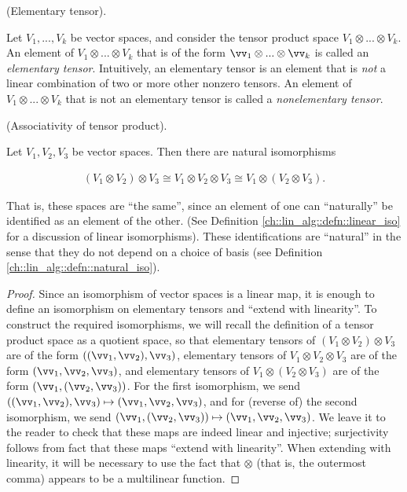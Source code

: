 \begin{defn}
    (Elementary tensor). 
    
    Let $V_1, ..., V_k$ be vector spaces, and consider the tensor product space $V_1 \otimes ... \otimes V_k$. An element of $V_1 \otimes ... \otimes V_k$ that is of the form $\vv_1 \otimes ... \otimes \vv_k$ is called an \textit{elementary tensor}. Intuitively, an elementary tensor is an element that is \textit{not} a linear combination of two or more other nonzero tensors. An element of $V_1 \otimes ... \otimes V_k$ that is not an elementary tensor is called a \textit{nonelementary tensor}.
\end{defn}

\begin{theorem}
    (Associativity of tensor product). 
    
    Let $V_1, V_2, V_3$ be vector spaces. Then there are natural isomorphisms
    
    \begin{align*}
        (V_1 \otimes V_2) \otimes V_3 \cong V_1 \otimes V_2 \otimes V_3 \cong V_1 \otimes (V_2 \otimes V_3).
    \end{align*}
    
    That is, these spaces are ``the same'', since an element of one can ``naturally'' be identified as an element of the other. (See Definition \ref{ch::lin_alg::defn::linear_iso} for a discussion of linear isomorphisms). These identifications are ``natural'' in the sense that they do not depend on a choice of basis (see Definition \ref{ch::lin_alg::defn::natural_iso}).
\end{theorem}

\begin{proof}
    Since an isomorphism of vector spaces is a linear map, it is enough to define an isomorphism on elementary tensors and ``extend with linearity''. To construct the required isomorphisms, we will recall the definition of a tensor product space as a quotient space, so that elementary tensors of $(V_1 \otimes V_2) \otimes V_3$ are of the form $((\vv_1, \vv_2), \vv_3)$, elementary tensors of $V_1 \otimes V_2 \otimes V_3$ are of the form $(\vv_1, \vv_2, \vv_3)$, and elementary tensors of $V_1 \otimes (V_2 \otimes V_3)$ are of the form $(\vv_1, (\vv_2, \vv_3))$. For the first isomorphism, we send $((\vv_1, \vv_2), \vv_3) \mapsto (\vv_1, \vv_2, \vv_3)$, and for (reverse of) the second isomorphism, we send $(\vv_1, (\vv_2, \vv_3)) \mapsto (\vv_1, \vv_2, \vv_3)$. We leave it to the reader to check that these maps are indeed linear and injective; surjectivity follows from fact that these maps ``extend with linearity''. When extending with linearity, it will be necessary to use the fact that $\otimes$ (that is, the outermost comma) appears to be a multilinear function.
\end{proof}

